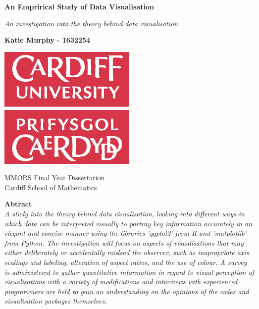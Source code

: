 \documentclass[
  11pt,
]{book}
\author{}
\date{\vspace{-2.5em}}
\begin{document}
\frontmatter

\mainmatter
\begin{titlepage}
    \begin{center}
        \vspace*{2cm}

        \textbf{An Emprirical Study of Data Visualisation}

        \vspace{0.5cm}
        \textit{An investigation into the theory behind data visualisation}

        \vspace{1.5cm}

        \textbf{Katie Murphy - 1632254}
        \vspace{1.5cm}

        \includegraphics[width=0.5\textwidth]{universitylogo.eps}

        \vfill


        MMORS Final Year Dissertation\\

        \vspace{0.5cm}
        Cardiff School of Mathematics

        \vspace{1.5cm}
        
        \textbf{Abtract}\\
        
        \textit{A study into the theory behind data visualisation, looking into different ways in which data can be
        interpreted visually to portray key information accurately in an elegant and concise manner using the
        libraries 'ggplot2' from R and 'matplotlib' from Python. The investigation will focus on aspects of
        visualisations that may either deliberately or accidentally mislead the observer, such as inapropriate axis 
        scalings and labeling, alteration of aspect ratios, and the use of colour. A survey is administered to gather
        quantitative information in regard to visual perception of visualisations with a variety of modifications and interviews with experienced programmers are held to gain an understanding on the
        opinions of the codes and visualisation packages themselves.}

    \end{center}
    

\end{titlepage}
\end{document}
